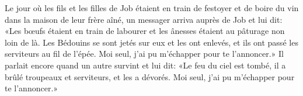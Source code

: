 Le jour où les fils et les filles de Job étaient en train de festoyer
	et de boire du vin dans la maison de leur frère aîné,
	un messager arriva auprès de Job et lui dit:
	«Les bœufs étaient en train de labourer
		et les ânesses étaient au pâturage non loin de là.
Les Bédouins se sont jetés sur eux et les ont enlevés,
	et ils ont passé les serviteurs au fil de l’épée.
	Moi seul, j’ai pu m’échapper pour te l’annoncer.»
Il parlait encore quand un autre survint et lui dit:
	«Le feu du ciel est tombé, il a brûlé troupeaux et serviteurs, et les a dévorés.
	Moi seul, j’ai pu m’échapper pour te l’annoncer.»
